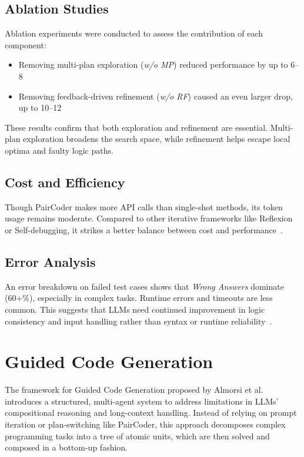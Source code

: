 \documentclass[11pt,a4paper]{article}
\begin{document}
\subsection{Ablation Studies}
Ablation experiments were conducted to assess the contribution of each component:
\begin{itemize}
\item Removing multi-plan exploration (\textit{w/o MP}) reduced performance by up to 6–8%
\item Removing feedback-driven refinement (\textit{w/o RF}) caused an even larger drop, up to 10–12%
\end{itemize}

These results confirm that both exploration and refinement are essential. Multi-plan exploration broadens the search space, while refinement helps escape local optima and faulty logic paths.

\subsection{Cost and Efficiency}
Though PairCoder makes more API calls than single-shot methods, its token usage remains moderate. Compared to other iterative frameworks like Reflexion or Self-debugging, it strikes a better balance between cost and performance~\cite{zhang2024paircoder}.

\subsection{Error Analysis}
An error breakdown on failed test cases shows that \textit{Wrong Answers} dominate (60+\%), especially in complex tasks. Runtime errors and timeouts are less common. This suggests that LLMs need continued improvement in logic consistency and input handling rather than syntax or runtime reliability~\cite{zhang2024paircoder}.

\section{Guided Code Generation}
The framework for Guided Code Generation proposed by Almorsi et al.\cite{almorsi2025guided} introduces a structured, multi-agent system to address limitations in LLMs' compositional reasoning and long-context handling. Instead of relying on prompt iteration or plan-switching like PairCoder, this approach decomposes complex programming tasks into a tree of atomic units, which are then solved and composed in a bottom-up fashion.
\end{document}
